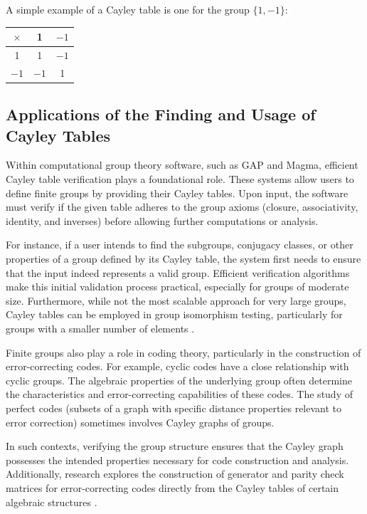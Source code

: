 \documentclass[sigconf]{acmart}
\begin{document}
A simple example of a Cayley table is one for the group \(\{1,-1 \}\):
\begin{center}
\begin{tabular}{|c|c|c|}
\hline
$\times$ & 1 & $-1$ \\
\hline
1   & 1   & $-1$ \\
\hline
$-1$ & $-1$ & 1   \\
\hline
\end{tabular}
\end{center}

\subsection{Applications of the Finding and Usage of Cayley Tables}

Within computational group theory software, such as GAP and Magma, efficient Cayley table verification plays a foundational role.
These systems allow users to define finite groups by providing their Cayley tables.
Upon input, the software must verify if the given table adheres to the group axioms (closure, associativity, identity, and inverses)
before allowing further computations or analysis. 

For instance, if a user intends to find the subgroups, conjugacy classes, or
other properties of a group defined by its Cayley table, the system first needs to ensure that the input indeed represents a valid group. 
Efficient verification algorithms make this initial validation process practical, especially for groups of moderate size. 
Furthermore, while not the most scalable approach for very large groups, Cayley tables can be employed in group isomorphism 
testing, particularly for groups with a smaller number of elements \cite{williams2015group}.

Finite groups also play a role in coding theory, particularly in the construction of error-correcting codes. For example, cyclic codes have a close 
relationship with cyclic groups. The algebraic properties of the underlying group often determine the characteristics and error-correcting
capabilities of these codes. The study of perfect codes (subsets of a graph with specific distance properties relevant to error correction)
sometimes involves Cayley graphs of groups.

In such contexts, verifying the group structure ensures that the Cayley graph possesses
the intended properties necessary for code construction and analysis. Additionally, research explores the construction of generator
and parity check matrices for error-correcting codes directly from the Cayley tables of certain algebraic structures \cite{zurekCodingTheory}.
\end{document}
